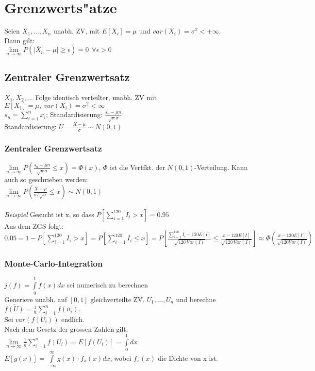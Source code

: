 \documentclass[10pt, a4paper, twocolumn]{scrartcl}
\begin{document}
\section{Grenzwerts"atze}

Seien $X_1,\ldots,X_n$ unabh. ZV, mit $E[X_i]=\mu$ und $var(X_i)=\sigma^2<+\infty$.\\
Dann gilt:\\
$\lim\limits_{n\rightarrow\infty}P(\mid\bar{X}_n-\mu\mid\geq\epsilon)=0\:\:\forall\epsilon>0$


\subsection{Zentraler Grenzwertsatz}

$X_1,X_2,\ldots$ Folge identisch verteilter, unabh. ZV mit $E[X_i]=\mu,\: var(X_i)=\sigma^2<\infty$\\
$s_n=\sum\limits^{n}_{i=1}x_i$; Standardisierung: $\frac{s_n-\mu n}{\sqrt{n}\sigma}$\\

Standardisierung: $U=\frac{X-\mu}{\sigma}\sim N(0,1)$

\subsubsection{Zentraler Grenzwertsatz}
$\lim\limits_{n\rightarrow\infty}P(\frac{s_n-\mu n}{\sqrt{n}\sigma}\leq x)=\Phi(x)$, $\Phi$ ist die Vertfkt. der $N(0,1)$-Verteilung. Kann auch so geschrieben werden:\\
$\lim\limits_{n\rightarrow\infty}P(\frac{\bar{X}-\mu}{\sigma/\sqrt{n}}\leq x)\sim N(0,1)$\\\\

\textit{Beispiel} Gesucht ist x, so dass $P[\sum\limits^{120}_{i=1}I_i>x]=0.95$\\
Aus dem ZGS folgt:\\
$0.05=1-P[\sum\limits^{120}_{i=1}I_i>x]=P[\sum\limits^{120}_{i=1}I_i\leq x]=P[\frac{\sum\limits^{120}_{i=1}I_i-120E[I]}{\sqrt{120\:Var(I)}}\leq\frac{x-120E[I]}{\sqrt{120\:Var(I)}}]\approx\Phi(\frac{x-120E[I]}{\sqrt{120Var(I)}})$

\subsubsection{Monte-Carlo-Integration}
$j(f)=\int\limits^{1}_{0}f(x)dx$ sei numerisch zu berechnen\\
Generiere unabh. auf $[0,1]$ gleichverteilte ZV. $U_1,\ldots,U_n$ und berechne $\bar{f(U)}=\frac{1}{n}\sum\limits^{n}_{i=1}f(u_i)$.\\
Sei $var(f(U_i))$ endlich.\\
Nach dem Gesetz der grossen Zahlen gilt:\\
$\lim\limits_{n\rightarrow\infty}\frac{1}{n}\sum\limits^{n}_{i=1}f(U_i)=E[f(U_i)]=\int\limits^{1}_{0}dx$\\
$E[g(x)]=\int\limits^\infty_{-\infty}g(x)\cdotp f_x(x)dx$, wobei $f_x(x)$ die Dichte von x ist.
\end{document}
